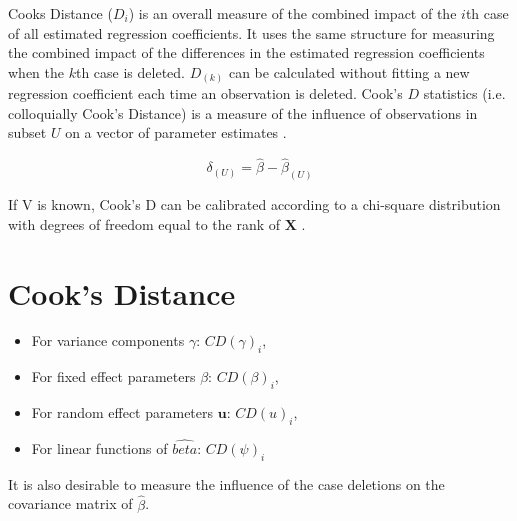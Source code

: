 \documentclass[12pt, a4paper]{report}
\theoremstyle{plain}
\theoremstyle{definition}
\theoremstyle{remark}
\begin{document}
		Cooks Distance ($D_{i}$) is an overall measure of the combined impact of the $i$th case of all estimated regression coefficients. It uses the same structure for measuring the combined impact of the differences in the estimated regression coefficients when the $k$th case is deleted. $D_{(k)}$ can be calculated without fitting
		a new regression coefficient each time an observation is deleted.
		 Cook's $D$ statistics (i.e. colloquially Cook's Distance) is a measure of the influence of observations in subset $U$ on a vector of parameter estimates \citep{cook77}.
		
		\[ \delta_{(U)} = \hat{\beta} - \hat{\beta}_{(U)}\]
		
		If V is known, Cook's D can be calibrated according to a chi-square distribution with degrees of freedom equal to the rank of $\boldsymbol{X}$ \citep{cpj92}.
		
		
		
		

			\section{Cook's Distance}
			\begin{itemize}
				\item For variance components $\gamma$: $CD(\gamma)_i$,
				\item For fixed effect parameters $\beta$: $CD(\beta)_i$,
				\item For random effect parameters $\boldsymbol{u}$: $CD(u)_i$,
				\item For linear functions of $\hat{beta}$: $CD(\psi)_i$
			\end{itemize}
			
			
			
			It is also desirable to measure the influence of the case deletions on the covariance matrix of $\hat{\beta}$.
				
\end{document}
